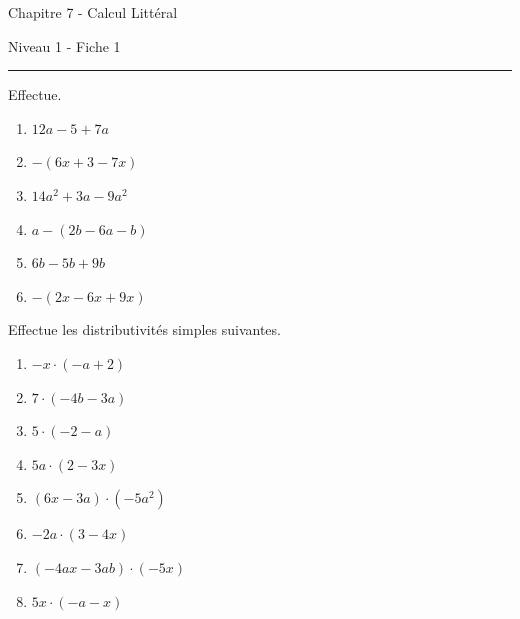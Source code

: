 \documentclass[12pt,parskip=half-, twoside=semi]{scrartcl}
\begin{document}

\begin{center}
  \bfseries
  \begin{Huge}
    Chapitre 7 - Calcul Littéral
  \end{Huge}
  \smallbreak
  \begin{large}
    Niveau 1  - Fiche 1
  \end{large}
  \smallbreak
  \rule[10pt]{.5\linewidth}{1 pt}
\end{center}

\setcounter{exercise}{0}
\begin{exercise} Effectue.
  \begin{enumerate}[cols=3]
      \item \(12 a-5+7 a\)
      \item \(-(6 x+3-7 x)\)
      \item \(14 a^2+3 a-9 a^2\)
      \item \(a-(2 b-6 a-b)\)
      \item \(6 b-5 b+9 b\)
      \item \(-(2 x-6 x+9 x)\)
  \end{enumerate}
\end{exercise}

\begin{exercise} Effectue les distributivités simples suivantes.
  \begin{enumerate}[cols=2]
    \item $-x \cdot(-a+2)$
    \item $7 \cdot(-4 b-3 a)$
    \item $5 \cdot(-2-a)$
    \item $5 a \cdot(2-3 x)$
    \item $(6 x-3 a) \cdot\left(-5 a^2\right)$
    \item $-2 a \cdot(3-4 x)$
    \item $(-4 a x-3 a b) \cdot(-5 x)$
    \item $5 x \cdot(-a-x)$
  \end{enumerate}
\end{exercise}
\end{document}

